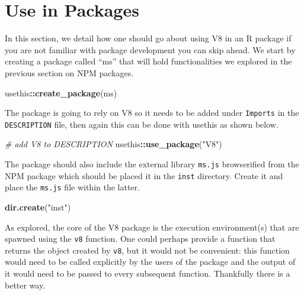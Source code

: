 \documentclass[
  10pt,
]{krantz}
\makeatletter
\newenvironment{Shaded}{\begin{snugshade}}{\end{snugshade}}
\newcommand{\CommentTok}[1]{\textcolor[rgb]{0.37,0.37,0.37}{\textit{#1}}}
\newcommand{\KeywordTok}[1]{\textcolor[rgb]{0.27,0.27,0.27}{\textbf{#1}}}
\newcommand{\NormalTok}[1]{#1}
\newcommand{\OperatorTok}[1]{\textcolor[rgb]{0.43,0.43,0.43}{\textbf{#1}}}
\newcommand{\StringTok}[1]{\textcolor[rgb]{0.5,0.5,0.5}{#1}}
\newenvironment{kframe}{%
\medskip{}
\setlength{\fboxsep}{.8em}
 \def\at@end@of@kframe{}%
 \ifinner\ifhmode%
  \def\at@end@of@kframe{\end{minipage}}%
  \begin{minipage}{\columnwidth}%
 \fi\fi%
 \def\FrameCommand##1{\hskip\@totalleftmargin \hskip-\fboxsep
 \colorbox{shadecolor}{##1}\hskip-\fboxsep
     \hskip-\linewidth \hskip-\@totalleftmargin \hskip\columnwidth}%
 \MakeFramed {\advance\hsize-\width
   \@totalleftmargin\z@ \linewidth\hsize
   \@setminipage}}%
 {\par\unskip\endMakeFramed%
 \at@end@of@kframe}
\renewenvironment{Shaded}{\begin{kframe}}{\end{kframe}}
\makeatother
\begin{document}
\hypertarget{v8-pkg}{%
\section{Use in Packages}\label{v8-pkg}}

In this section, we detail how one should go about using V8 in an R package if you are not familiar with package development you can skip ahead. We start by creating a package called ``ms'' that will hold functionalities we explored in the previous section on NPM packages.

\begin{Shaded}
\begin{Highlighting}[]
\NormalTok{usethis}\OperatorTok{::}\KeywordTok{create\_package}\NormalTok{(}\StringTok{\textquotesingle{}ms\textquotesingle{}}\NormalTok{)}
\end{Highlighting}
\end{Shaded}

The package is going to rely on V8 so it needs to be added under \texttt{Imports} in the \texttt{DESCRIPTION} file, then again this can be done with usethis as shown below.

\begin{Shaded}
\begin{Highlighting}[]
\CommentTok{\# add V8 to DESCRIPTION}
\NormalTok{usethis}\OperatorTok{::}\KeywordTok{use\_package}\NormalTok{(}\StringTok{"V8"}\NormalTok{)}
\end{Highlighting}
\end{Shaded}

The package should also include the external library \texttt{ms.js} browserified from the NPM package which should be placed it in the \texttt{inst} directory. Create it and place the \texttt{ms.js} file within the latter.

\begin{Shaded}
\begin{Highlighting}[]
\KeywordTok{dir.create}\NormalTok{(}\StringTok{"inst"}\NormalTok{)}
\end{Highlighting}
\end{Shaded}

As explored, the core of the V8 package is the execution environment(s) that are spawned using the \texttt{v8} function. One could perhaps provide a function that returns the object created by \texttt{v8}, but it would not be convenient: this function would need to be called explicitly by the users of the package and the output of it would need to be passed to every subsequent function. Thankfully there is a better way.
\end{document}
